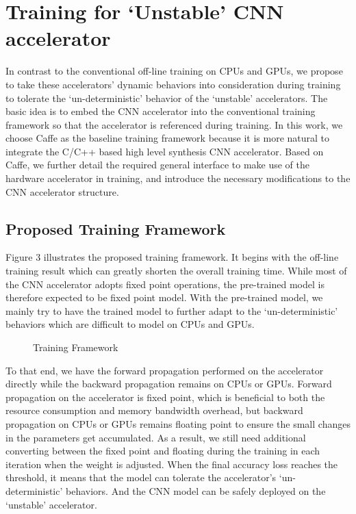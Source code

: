 \section{Training for ‘Unstable’ CNN accelerator} \label{sec:framework}
  In contrast to the conventional off-line training on CPUs and GPUs, we propose 
to take these accelerators’ dynamic behaviors into consideration during training 
to tolerate the ‘un-deterministic’ behavior of the ‘unstable’ accelerators. The basic 
idea is to embed the CNN accelerator into the conventional training framework so that 
the accelerator is referenced during training. In this work, we choose Caffe as the baseline 
training framework because it is more natural to integrate the C/C++ based high 
level synthesis CNN accelerator. Based on Caffe, we further detail the required general 
interface to make use of the hardware accelerator in training, and introduce 
the necessary modifications to the CNN accelerator structure. 
\subsection{Proposed Training Framework }
  Figure 3 illustrates the proposed training framework. It begins with the 
off-line training result which can greatly shorten the overall training time. 
While most of the CNN accelerator adopts fixed point operations, the pre-trained model 
is therefore expected to be fixed point model. With the pre-trained model, 
we mainly try to have the trained model to further adapt to the ‘un-deterministic’ 
behaviors which are difficult to model on CPUs and GPUs.

\begin{figure*}
        \caption{Training Framework}
        \label{fig:retrain}
\end{figure*}


  To that end, we have the forward propagation performed on the accelerator 
directly while the backward propagation remains on CPUs or GPUs. Forward propagation 
on the accelerator is fixed point, which is beneficial to both the resource consumption 
and memory bandwidth overhead, but backward propagation on CPUs or GPUs remains floating 
point to ensure the small changes in the parameters get accumulated\cite{Matthieu2014_8}. As a result, 
we still need additional converting between the fixed point and floating during 
the training in each iteration when the weight is adjusted. When the final accuracy 
loss reaches the threshold, it means that the model can tolerate 
the accelerator’s ‘un-deterministic’ behaviors. And the CNN model can be safely 
deployed on the ‘unstable’ accelerator. 

